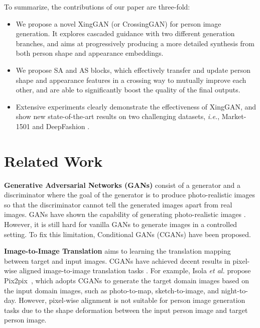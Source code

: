\documentclass[runningheads]{llncs}
\begin{document}
To summarize, the contributions of our paper are three-fold:
\begin{itemize}
	\item We propose a novel XingGAN (or CrossingGAN) for person image generation. It explores cascaded guidance with two different generation branches, and aims at progressively producing a more detailed synthesis from both person shape and appearance embeddings.
	\item We propose SA and AS blocks, which effectively transfer and update person shape and appearance features in a crossing way to mutually improve each other, and are able to significantly boost the quality of the final outputs.
	\item Extensive experiments clearly demonstrate the effectiveness of XingGAN, and show new state-of-the-art results on two challenging datasets, \emph{i.e.}, Market-1501 \cite{zheng2015scalable} and DeepFashion \cite{liu2016deepfashion}.
\end{itemize} \section{Related Work}
\noindent \textbf{Generative Adversarial Networks (GANs)} \cite{goodfellow2014generative} consist of a generator and a discriminator where the goal of the generator is to produce photo-realistic images so that the discriminator cannot tell the generated images apart from real images.
GANs have shown the capability of generating photo-realistic images \cite{brock2018large,karras2018style,shaham2019singan}.
However, it is still hard for vanilla GANs to generate images in a controlled setting.
To fix this limitation, Conditional GANs (CGANs) \cite{mirza2014conditional} have been proposed.

\noindent \textbf{Image-to-Image Translation} aims to learning the translation mapping between target and input images. CGANs have achieved decent results in pixel-wise aligned image-to-image translation tasks \cite{isola2017image,tang2018gesturegan,albahar2019guided}.
For example, Isola \emph{et al.} propose Pix2pix~\cite{isola2017image}, which adopts CGANs to generate the target domain images based on the input domain images, such as photo-to-map, sketch-to-image, and night-to-day. 
However, pixel-wise alignment is not suitable for person image generation tasks due to the shape deformation between the input person image and target person image.
\end{document}
